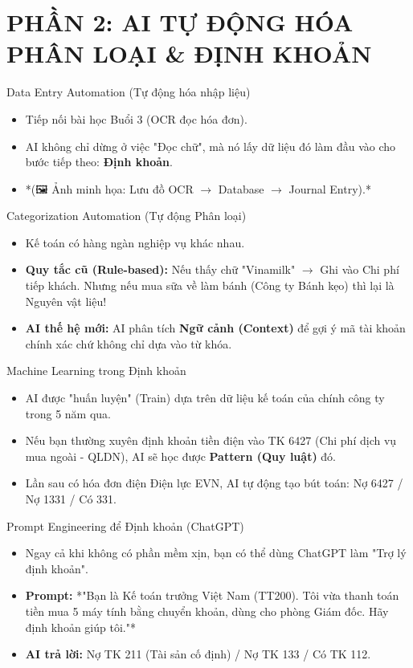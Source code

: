 \documentclass[aspectratio=169]{beamer}
\begin{document}
\section{PHẦN 2: AI TỰ ĐỘNG HÓA PHÂN LOẠI \& ĐỊNH KHOẢN}


\begin{frame}{Data Entry Automation (Tự động hóa nhập liệu)}
    \begin{itemize}
        \item Tiếp nối bài học Buổi 3 (OCR đọc hóa đơn).
        \item AI không chỉ dừng ở việc "Đọc chữ", mà nó lấy dữ liệu đó làm đầu vào cho bước tiếp theo: \textbf{Định khoản}.
        \item *(🖼️ Ảnh minh họa: Lưu đồ OCR $\rightarrow$ Database $\rightarrow$ Journal Entry).*
    \end{itemize}
\end{frame}


\begin{frame}{Categorization Automation (Tự động Phân loại)}
    \begin{itemize}
        \item Kế toán có hàng ngàn nghiệp vụ khác nhau.
        \item \textbf{Quy tắc cũ (Rule-based):} Nếu thấy chữ "Vinamilk" $\rightarrow$ Ghi vào Chi phí tiếp khách. Nhưng nếu mua sữa về làm bánh (Công ty Bánh kẹo) thì lại là Nguyên vật liệu!
        \item \textbf{AI thế hệ mới:} AI phân tích \textbf{Ngữ cảnh (Context)} để gợi ý mã tài khoản chính xác chứ không chỉ dựa vào từ khóa.
    \end{itemize}
\end{frame}


\begin{frame}{Machine Learning trong Định khoản}
    \begin{itemize}
        \item AI được "huấn luyện" (Train) dựa trên dữ liệu kế toán của chính công ty trong 5 năm qua.
        \item Nếu bạn thường xuyên định khoản tiền điện vào TK 6427 (Chi phí dịch vụ mua ngoài - QLDN), AI sẽ học được \textbf{Pattern (Quy luật)} đó.
        \item Lần sau có hóa đơn điện Điện lực EVN, AI tự động tạo bút toán: Nợ 6427 / Nợ 1331 / Có 331.
    \end{itemize}
\end{frame}


\begin{frame}{Prompt Engineering để Định khoản (ChatGPT)}
    \begin{itemize}
        \item Ngay cả khi không có phần mềm xịn, bạn có thể dùng ChatGPT làm "Trợ lý định khoản".
        \item \textbf{Prompt:} *"Bạn là Kế toán trưởng Việt Nam (TT200). Tôi vừa thanh toán tiền mua 5 máy tính bằng chuyển khoản, dùng cho phòng Giám đốc. Hãy định khoản giúp tôi."*
        \item \textbf{AI trả lời:} Nợ TK 211 (Tài sản cố định) / Nợ TK 133 / Có TK 112.
    \end{itemize}
\end{frame}
\end{document}
